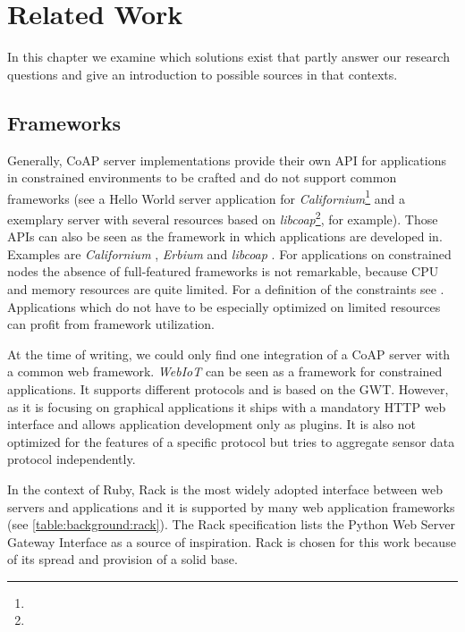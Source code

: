 \chapter{Related Work}
\label{cha:related-work}

In this chapter we examine which solutions exist that partly answer our
research questions and give an introduction to possible sources in that
contexts.

\section{Frameworks}

	Generally, \ac{CoAP} server implementations provide their own \ac{API} for
	applications in constrained environments to be crafted and do not support
	common frameworks (see a Hello World server application for
	\emph{Californium}\footnote{\urlCaliforniumHelloWorld} and a exemplary
	server with several resources based on
	\emph{libcoap}\footnote{\urlLibcoapExample}, for example). Those \acp{API}
	can also be seen as the framework in which applications are developed in.
	Examples are \emph{Californium} \cite{californium}, \emph{Erbium}
	\cite{erbium} and \emph{libcoap} \cite{libcoap}. For applications on
	constrained nodes the absence of full-featured frameworks is not
	remarkable, because \ac{CPU} and memory resources are quite limited. For a
	definition of the constraints see \cite{terminology}. Applications which do
	not have to be especially optimized on limited resources can profit from
	framework utilization.
	
	At the time of writing, we could only find one integration of a \ac{CoAP}
	server with a common web framework. \emph{Web\acs{IoT}} \cite{webiot} can
	be seen as a framework for constrained applications. It supports different
	protocols and is based on the \ac{GWT}. However, as it is focusing on
	graphical applications it ships with a mandatory \ac{HTTP} web interface
	and allows application development only as plugins. It is also not
	optimized for the features of a specific protocol but tries to aggregate
	sensor data protocol independently.

	In the context of Ruby, Rack is the most widely adopted interface between
	web servers and applications and it is supported by many web application
	frameworks (see \autoref{table:background:rack}). The Rack specification
	\cite{rack} lists the Python Web Server Gateway Interface \cite{pep333} as
	a source of inspiration. Rack is chosen for this work because of its spread
	and provision of a solid base.

